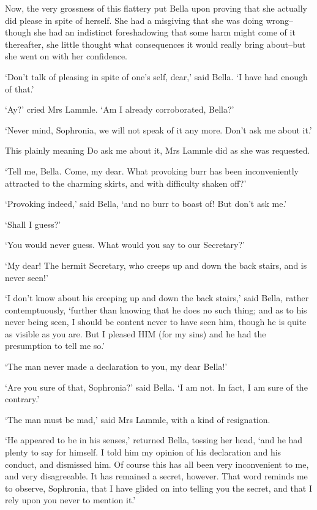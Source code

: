Now, the very grossness of this flattery put Bella upon proving that she
actually did please in spite of herself. She had a misgiving that she
was doing wrong--though she had an indistinct foreshadowing that some
harm might come of it thereafter, she little thought what consequences
it would really bring about--but she went on with her confidence.

‘Don’t talk of pleasing in spite of one’s self, dear,’ said Bella. ‘I
have had enough of that.’

‘Ay?’ cried Mrs Lammle. ‘Am I already corroborated, Bella?’

‘Never mind, Sophronia, we will not speak of it any more. Don’t ask me
about it.’

This plainly meaning Do ask me about it, Mrs Lammle did as she was
requested.

‘Tell me, Bella. Come, my dear. What provoking burr has been
inconveniently attracted to the charming skirts, and with difficulty
shaken off?’

‘Provoking indeed,’ said Bella, ‘and no burr to boast of! But don’t ask
me.’

‘Shall I guess?’

‘You would never guess. What would you say to our Secretary?’

‘My dear! The hermit Secretary, who creeps up and down the back stairs,
and is never seen!’

‘I don’t know about his creeping up and down the back stairs,’ said
Bella, rather contemptuously, ‘further than knowing that he does no such
thing; and as to his never being seen, I should be content never to have
seen him, though he is quite as visible as you are. But I pleased HIM
(for my sins) and he had the presumption to tell me so.’

‘The man never made a declaration to you, my dear Bella!’

‘Are you sure of that, Sophronia?’ said Bella. ‘I am not. In fact, I am
sure of the contrary.’

‘The man must be mad,’ said Mrs Lammle, with a kind of resignation.

‘He appeared to be in his senses,’ returned Bella, tossing her head,
‘and he had plenty to say for himself. I told him my opinion of his
declaration and his conduct, and dismissed him. Of course this has all
been very inconvenient to me, and very disagreeable. It has remained a
secret, however. That word reminds me to observe, Sophronia, that I have
glided on into telling you the secret, and that I rely upon you never to
mention it.’


